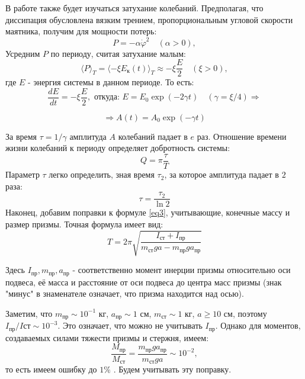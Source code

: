 \documentclass[a4paper]{article}
\begin{document}
\noindent
В работе также будет изучаться затухание колебаний. Предполагая, что диссипация обусловлена вязким трением, пропорциональным угловой скорости маятника, получим для мощности потерь:
\begin{equation}
P = -\alpha \dot{\varphi}^2 \quad (\alpha > 0),
\end{equation}
Усредним $P$ по периоду, считая затухание малым:
\[\langle P \rangle_T = \langle -\xi E_\text{к}(t) \rangle_T \approx -\xi \frac{E}{2} \quad (\xi > 0),\] 
где $E$ - энергия системы в данном периоде. То есть:
\[\frac{dE}{dt} = -\xi \frac{E}{2}, \text{ откуда: } E = E_0 \exp{(-2 \gamma t)} \quad (\gamma = \xi/4) \Rightarrow \]

\noindent
\begin{equation}
\Rightarrow A(t)= A_0 \exp{(-\gamma t)} 
\end{equation}

\noindent
За время $\tau = 1/\gamma$ амплитуда $A$ колебаний падает в $e$ раз. Отношение времени жизни колебаний к периоду определяет добротность системы:
\begin{equation}
Q = \pi \frac{\tau}{T}
\end{equation}
Параметр $\tau$ легко определить, зная время $\tau_2$, за которое амплитуда падает в $2$ раза:
\begin{equation}
\tau = \frac{\tau_2}{\ln 2}
\end{equation}
Наконец, добавим поправки к формуле \eqref{eq3}, учитывающие, конечные массу и размер призмы. Точная формула имеет вид:
\begin{equation}
T = 2\pi \sqrt{\frac{I_{\text{ст}} + I_{\text{пр}}}{m_{\text{ст}} g a - m_{\text{пр}} g a_{\text{пр}}} }
\end{equation}

\noindent
Здесь $I_{\text{пр}}, m_{\text{пр}}, a_{\text{пр}}$ - соответственно момент инерции призмы относительно оси подвеса, её масса и расстояние от оси подвеса до центра масс призмы (знак "минус" в знаменателе означает, что призма находится над осью).

\noindent
Заметим, что $m_{\text{пр}} \sim 10^{-1} \text{ кг}$, $a_{\text{пр}} \sim 1 \text{ см}$, $m_{\text{ст}} \sim 1 \text{ кг} $, $a \geq 10 \text{ см}$, поэтому $I_{\text{пр}}/I{\text{ст}} \sim 10^{-3}$. Это означает, что можно не учитывать $I_{\text{пр}}$. Однако для моментов, создаваемых силами тяжести призмы и стержня, имеем:
\[\frac{M_{\text{пр}}}{M_{\text{ст}}} = \frac{m_{\text{пр}} g a_{\text{пр}}}{m_{\text{ст}} g a} \sim 10^{-2},\]
то есть имеем ошибку до $1\%$ . Будем учитывать эту поправку.
\end{document}
